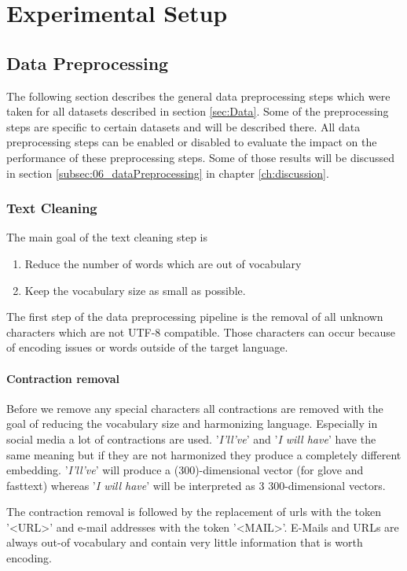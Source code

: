 \chapter{Experimental Setup}
\label{ch:setup}

\section{Data Preprocessing}
The following section describes the general data preprocessing steps which were taken for all datasets described in section \ref{sec:Data}. Some of the preprocessing steps are specific to certain datasets and will be described there. All data preprocessing steps can be enabled or disabled to evaluate the impact on the performance of these preprocessing steps. Some of those results will be discussed in section \ref{subsec:06_dataPreprocessing} in chapter \ref{ch:discussion}.

\subsection{Text Cleaning}
The main goal of the text cleaning step is 
\begin{enumerate}
	\item Reduce the number of words which are out of vocabulary
	\item Keep the vocabulary size as small as possible.
\end{enumerate}


The first step of the data preprocessing pipeline is the removal of all unknown characters which are not UTF-8 compatible. Those characters can occur because of encoding issues or words outside of the target language. 
\subsubsection*{Contraction removal}

Before we remove any special characters all contractions are removed with the goal of reducing the vocabulary size and harmonizing language. Especially in social media a lot of contractions are used. '\textit{I'll've}' and '\textit{I will have}' have the same meaning but if they are not harmonized they produce a completely different embedding. '\textit{I'll've}' will produce a (300)-dimensional vector (for glove and fasttext) whereas '\textit{I will have}' will be interpreted as 3 300-dimensional vectors.

The contraction removal is followed by the replacement of \glspl{url} with the token '<URL>' and e-mail addresses with the token '<MAIL>'. E-Mails and URLs are always out-of vocabulary and contain very little information that is worth encoding. 


